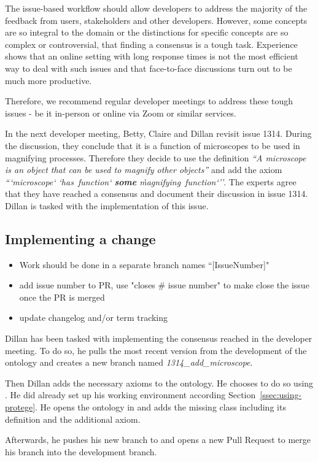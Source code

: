 The issue-based workflow should allow developers to address the majority of the feedback from users, stakeholders and other developers. However, some concepts are so integral to the domain or the distinctions for specific concepts are so complex or controversial, that finding a consensus is a tough task. Experience shows that an online setting with long response times is not the most efficient way to deal with such issues and that face-to-face discussions turn out to be much more productive.

Therefore, we recommend regular developer meetings to address these tough issues - be it in-person or online via Zoom or similar services. 

\begin{example}
In the next developer meeting, Betty, Claire and Dillan revisit issue 1314. During the discussion, they conclude that it is a function of microscopes to be used in magnifying processes. Therefore they decide to use the definition \emph{``A microscope is an object that can be used to magnify other objects''} and add the axiom
\emph{```microscope` `has~function` \textbf{some} \`magnifying~function`''}.
The experts agree that they have reached a consensus and document their discussion in issue 1314. Dillan is tasked with the implementation of this issue.
\end{example}

\subsection{Implementing a change}
\begin{itemize}
    \item  Work should be done in a separate branch names ``[IssueNumber]"
    \item add issue number to PR, use "closes \# issue number" to make {\github} close the issue once the PR is merged
    \item update changelog and/or term tracking
\end{itemize}

\begin{example}
Dillan has been tasked with implementing the consensus reached in the developer meeting. To do so, he pulls the most recent version from the development of the ontology and creates a new branch named \textit{1314\_add\_microscope}.

Then Dillan adds the necessary axioms to the ontology. He chooses to do so using {\protege}. He did already set up his working environment according Section~\ref{ssec:using-protege}. He opens the ontology in {\protege} and adds the missing class including its definition and the additional axiom.

Afterwards, he pushes his new branch to {\github} and opens a new Pull Request to merge his branch into the development branch.
\end{example}

